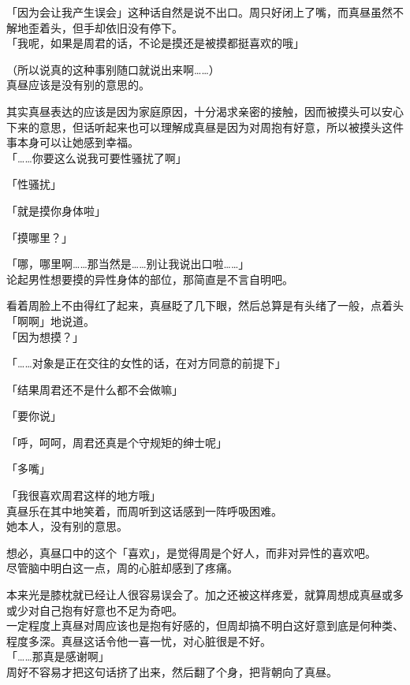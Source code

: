 「因为会让我产生误会」这种话自然是说不出口。周只好闭上了嘴，而真昼虽然不解地歪着头，但手却依旧没有停下。\\

「我呢，如果是周君的话，不论是摸还是被摸都挺喜欢的哦」

（所以说真的这种事别随口就说出来啊……）\\

真昼应该是没有别的意思的。

其实真昼表达的应该是因为家庭原因，十分渴求亲密的接触，因而被摸头可以安心下来的意思，但话听起来也可以理解成真昼是因为对周抱有好意，所以被摸头这件事本身可以让她感到幸福。\\

「……你要这么说我可要性骚扰了啊」

「性骚扰」

「就是摸你身体啦」

「摸哪里？」

「哪，哪里啊……那当然是……别让我说出口啦……」\\

论起男性想要摸的异性身体的部位，那简直是不言自明吧。

看着周脸上不由得红了起来，真昼眨了几下眼，然后总算是有头绪了一般，点着头「啊啊」地说道。\\

「因为想摸？」

「……对象是正在交往的女性的话，在对方同意的前提下」

「结果周君还不是什么都不会做嘛」

「要你说」

「呼，呵呵，周君还真是个守规矩的绅士呢」

「多嘴」

「我很喜欢周君这样的地方哦」\\

真昼乐在其中地笑着，而周听到这话感到一阵呼吸困难。\\

她本人，没有别的意思。

想必，真昼口中的这个「喜欢」，是觉得周是个好人，而非对异性的喜欢吧。\\

尽管脑中明白这一点，周的心脏却感到了疼痛。

本来光是膝枕就已经让人很容易误会了。加之还被这样疼爱，就算周想成真昼或多或少对自己抱有好意也不足为奇吧。\\

一定程度上真昼对周应该也是抱有好感的，但周却搞不明白这好意到底是何种类、程度多深。真昼这话令他一喜一忧，对心脏很是不好。\\

「……那真是感谢啊」\\

周好不容易才把这句话挤了出来，然后翻了个身，把背朝向了真昼。
